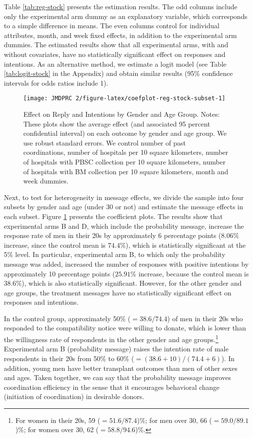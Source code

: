\documentclass[
  11pt,
  a4paper
]{article}
\begin{document}
Table \ref{tab:reg-stock} presents the estimation results. The odd columns include only the experimental arm dummy as an explanatory variable, which corresponds to a simple difference in means. The even columns control for individual attributes, month, and week fixed effects, in addition to the experimental arm dummies. The estimated results show that all experimental arms, with and without covariates, have no statistically significant effect on responses and intentions. As an alternative method, we estimate a logit model (see Table \ref{tab:logit-stock} in the Appendix) and obtain similar results (95\% confidence intervals for odds ratios include 1).

\begin{figure}[t]
\texttt{[image: JMDPRC~2/figure-latex/coefplot-reg-stock-subset-1]} \caption{Effect on Reply and Intentions by Gender and Age Group. Notes: These plots show the average effect (and associated 95 percent confidential interval) on each outcome by gender and age group. We use robust standard errors. We control number of past coordinations, number of hospitals per 10 square kilometers, number of hospitals with PBSC collection per 10 square kilometers, number of hospitals with BM collection per 10 square kilometers, month and week dummies.}\label{fig:coefplot-reg-stock-subset}
\end{figure}

Next, to test for heterogeneity in message effects, we divide the sample into four subsets by gender and age (under 30 or not) and estimate the message effects in each subset. Figure \ref{fig:coefplot-reg-stock-subset} presents the coefficient plots. The results show that experimental arms B and D, which include the probability message, increase the response rate of men in their 20s by approximately 6 percentage points (\(8.06\)\% increase, since the control mean is \(74.4\)\%), which is statistically significant at the 5\% level. In particular, experimental arm B, to which only the probability message was added, increased the number of responses with positive intentions by approximately 10 percentage points (\(25.91\)\% increase, because the control mean is \(38.6\)\%), which is also statistically significant. However, for the other gender and age groups, the treatment messages have no statistically significant effect on responses and intentions.

In the control group, approximately 50\% (\(=38.6/74.4\)) of men in their 20s who responded to the compatibility notice were willing to donate, which is lower than the willingness rate of respondents in the other gender and age groups.\footnote{For women in their 20s, 59 (\(=51.6/87.4\))\%; for men over 30, 66 (\(=59.0/89.1\))\%; for women over 30, 62 (\(=58.8/94.6\))\%.} Experimental arm B (probability message) raises the intention rate of male respondents in their 20s from 50\% to 60\% (\(=(38.6 + 10)/(74.4 + 6)\)). In addition, young men have better transplant outcomes than men of other sexes and ages. Taken together, we can say that the probability message improves coordination efficiency in the sense that it encourages behavioral change (initiation of coordination) in desirable donors.
\end{document}
